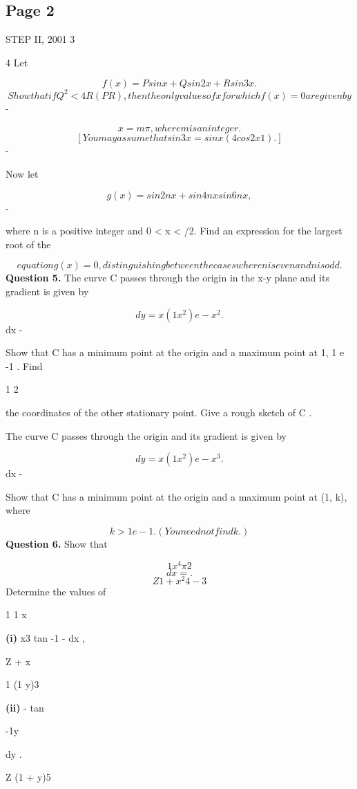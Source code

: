 \documentclass[12pt]{article}
\begin{document}
\subsection*{Page 2}
\begin{flushleft}
STEP II, 2001 3\par
4 Let\par
\[f (x) = P sin x + Q sin 2x + R sin 3x .\]
\[Show that if Q^2 < 4R(P R), then the only values of x for which f (x) = 0 are given by\]
-\par
\[x = m\pi, where m is an integer.\]
\[[You may assume that sin 3x = sin x(4 cos2 x 1).]\]
-\par
Now let\par
\[g (x) = sin 2nx + sin 4nx sin 6nx,\]
-\par
where n is a positive integer and 0 < x < \pi/2. Find an expression for the largest root of the\par
\[equation g (x) = 0, distinguishing between the cases where n is even and n is odd.\]
\bigskip\textbf{Question 5.} The curve C passes through the origin in the x-y plane and its gradient is given by\par
\[dy = x(1 x^2)e -x^2 .\]
dx -\par
Show that C has a minimum point at the origin and a maximum point at 1, 1 e -1 . Find\par
1 2\par
the coordinates of the other stationary point. Give a rough sketch of C .\par
The curve C passes through the origin and its gradient is given by\par
\[dy = x(1 x^2)e -x^3 .\]
dx -\par
Show that C has a minimum point at the origin and a maximum point at (1, k), where\par
\[k > 1 e -1. (You need not find k.)\]
\bigskip\textbf{Question 6.} Show that\par
\[1 x^4 \pi 2\]
\[dx = .\]
\[Z 1 + x^2 4 - 3\]
Determine the values of\par
1 1 x\par
\textbf{(i)} x3 tan -1 - dx ,\par
Z  + x \mu\par
1 (1 y)3\par
\textbf{(ii)} - tan\par
-1y\par
dy .\par
Z (1 + y)5\par
\end{flushleft}
\end{document}
